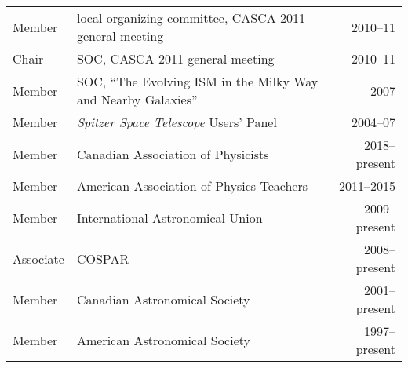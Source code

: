\begin{tabularx}{\textwidth}{lXr}
Member& local organizing committee, CASCA 2011 general meeting&2010--11\\
Chair& SOC, CASCA 2011 general meeting&2010--11\\
Member& SOC, ``The Evolving ISM in the Milky Way and Nearby Galaxies'' & 2007\\
Member& {\it Spitzer Space Telescope} Users' Panel& 2004--07\\
Member& Canadian Association of Physicists& 2018--present\\
Member& American Association of Physics Teachers& 2011--2015\\
Member& International Astronomical Union& 2009--present\\
Associate& COSPAR& 2008--present\\
Member& Canadian Astronomical Society& 2001--present\\
Member& American Astronomical Society& 1997--present
\end{tabularx}
